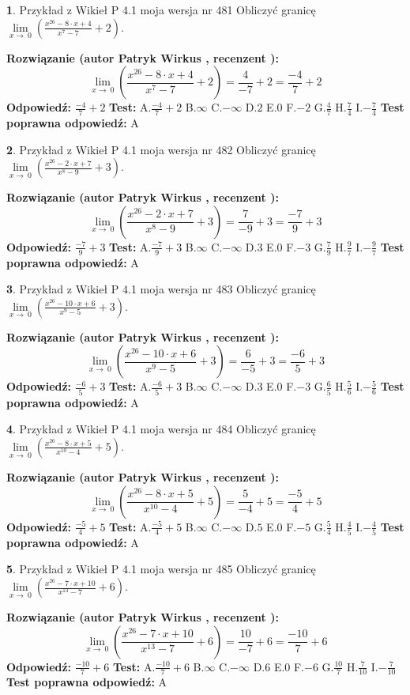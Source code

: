 \documentclass[12pt, a4paper]{article}
\theoremstyle{definition} %
\newtheorem{zad}{}
\newcommand{\zadStart}[1]{\begin{zad}#1\newline}
\newcommand{\zadStop}{\end{zad}}
\newcommand{\rozwStart}[2]{\noindent \textbf{Rozwiązanie (autor #1 , recenzent #2): }\newline}
\newcommand{\rozwStop}{\newline}
\newcommand{\odpStart}{\noindent \textbf{Odpowiedź:}\newline}
\newcommand{\odpStop}{\newline}
\newcommand{\testStart}{\noindent \textbf{Test:}\newline}
\newcommand{\testStop}{\newline}
\newcommand{\kluczStart}{\noindent \textbf{Test poprawna odpowiedź:}\newline}
\newcommand{\kluczStop}{\newline}
\begin{document}
\zadStart{Przykład z Wikieł P 4.1 moja wersja nr 481}
Obliczyć granicę $\lim\limits_{x\to\ 0}(\frac{x^{26}-8 \cdot x +4}{x^{7}-7}+2)$.
\zadStop
\rozwStart{Patryk Wirkus}{}
$$\lim\limits_{x\to\ 0}(\frac{x^{26}-8 \cdot x +4}{x^{7}-7}+2)=\frac{4}{-7}+2=\frac{-4}{7}+2$$
\rozwStop
\odpStart
$\frac{-4}{7}+2$
\odpStop
\testStart
A.$\frac{-4}{7}+2$
B.$\infty$
C.$-\infty$
D.$2$
E.$0$
F.$-2$
G.$\frac{4}{7}$
H.$\frac{7}{4}$
I.$-\frac{7}{4}$
\testStop
\kluczStart
A
\kluczStop



\zadStart{Przykład z Wikieł P 4.1 moja wersja nr 482}
Obliczyć granicę $\lim\limits_{x\to\ 0}(\frac{x^{26}-2 \cdot x +7}{x^{8}-9}+3)$.
\zadStop
\rozwStart{Patryk Wirkus}{}
$$\lim\limits_{x\to\ 0}(\frac{x^{26}-2 \cdot x +7}{x^{8}-9}+3)=\frac{7}{-9}+3=\frac{-7}{9}+3$$
\rozwStop
\odpStart
$\frac{-7}{9}+3$
\odpStop
\testStart
A.$\frac{-7}{9}+3$
B.$\infty$
C.$-\infty$
D.$3$
E.$0$
F.$-3$
G.$\frac{7}{9}$
H.$\frac{9}{7}$
I.$-\frac{9}{7}$
\testStop
\kluczStart
A
\kluczStop



\zadStart{Przykład z Wikieł P 4.1 moja wersja nr 483}
Obliczyć granicę $\lim\limits_{x\to\ 0}(\frac{x^{26}-10 \cdot x +6}{x^{9}-5}+3)$.
\zadStop
\rozwStart{Patryk Wirkus}{}
$$\lim\limits_{x\to\ 0}(\frac{x^{26}-10 \cdot x +6}{x^{9}-5}+3)=\frac{6}{-5}+3=\frac{-6}{5}+3$$
\rozwStop
\odpStart
$\frac{-6}{5}+3$
\odpStop
\testStart
A.$\frac{-6}{5}+3$
B.$\infty$
C.$-\infty$
D.$3$
E.$0$
F.$-3$
G.$\frac{6}{5}$
H.$\frac{5}{6}$
I.$-\frac{5}{6}$
\testStop
\kluczStart
A
\kluczStop



\zadStart{Przykład z Wikieł P 4.1 moja wersja nr 484}
Obliczyć granicę $\lim\limits_{x\to\ 0}(\frac{x^{26}-8 \cdot x +5}{x^{10}-4}+5)$.
\zadStop
\rozwStart{Patryk Wirkus}{}
$$\lim\limits_{x\to\ 0}(\frac{x^{26}-8 \cdot x +5}{x^{10}-4}+5)=\frac{5}{-4}+5=\frac{-5}{4}+5$$
\rozwStop
\odpStart
$\frac{-5}{4}+5$
\odpStop
\testStart
A.$\frac{-5}{4}+5$
B.$\infty$
C.$-\infty$
D.$5$
E.$0$
F.$-5$
G.$\frac{5}{4}$
H.$\frac{4}{5}$
I.$-\frac{4}{5}$
\testStop
\kluczStart
A
\kluczStop



\zadStart{Przykład z Wikieł P 4.1 moja wersja nr 485}
Obliczyć granicę $\lim\limits_{x\to\ 0}(\frac{x^{26}-7 \cdot x +10}{x^{13}-7}+6)$.
\zadStop
\rozwStart{Patryk Wirkus}{}
$$\lim\limits_{x\to\ 0}(\frac{x^{26}-7 \cdot x +10}{x^{13}-7}+6)=\frac{10}{-7}+6=\frac{-10}{7}+6$$
\rozwStop
\odpStart
$\frac{-10}{7}+6$
\odpStop
\testStart
A.$\frac{-10}{7}+6$
B.$\infty$
C.$-\infty$
D.$6$
E.$0$
F.$-6$
G.$\frac{10}{7}$
H.$\frac{7}{10}$
I.$-\frac{7}{10}$
\testStop
\kluczStart
A
\kluczStop
\end{document}
